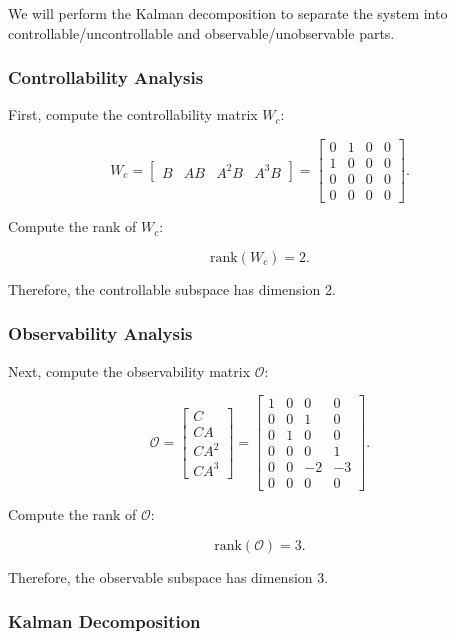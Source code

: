 \documentclass{article}
\begin{document}
We will perform the Kalman decomposition to separate the system into controllable/uncontrollable and observable/unobservable parts.

\subsubsection{Controllability Analysis}

First, compute the controllability matrix \( W_c \):

\[
W_c = \begin{bmatrix}
B & AB & A^2B & A^3B
\end{bmatrix} = \begin{bmatrix}
0 & 1 & 0 & 0 \\
1 & 0 & 0 & 0 \\
0 & 0 & 0 & 0 \\
0 & 0 & 0 & 0
\end{bmatrix}.
\]

Compute the rank of \( W_c \):

\[
\text{rank}(W_c) = 2.
\]

Therefore, the controllable subspace has dimension 2.

\subsubsection{Observability Analysis}

Next, compute the observability matrix \( \mathcal{O} \):

\[
\mathcal{O} = \begin{bmatrix}
C \\
CA \\
CA^2 \\
CA^3
\end{bmatrix} = \begin{bmatrix}
1 & 0 & 0 & 0 \\
0 & 0 & 1 & 0 \\
0 & 1 & 0 & 0 \\
0 & 0 & 0 & 1 \\
0 & 0 & -2 & -3 \\
0 & 0 & 0 & 0
\end{bmatrix}.
\]

Compute the rank of \( \mathcal{O} \):

\[
\text{rank}(\mathcal{O}) = 3.
\]

Therefore, the observable subspace has dimension 3.

\subsubsection{Kalman Decomposition}
\end{document}
